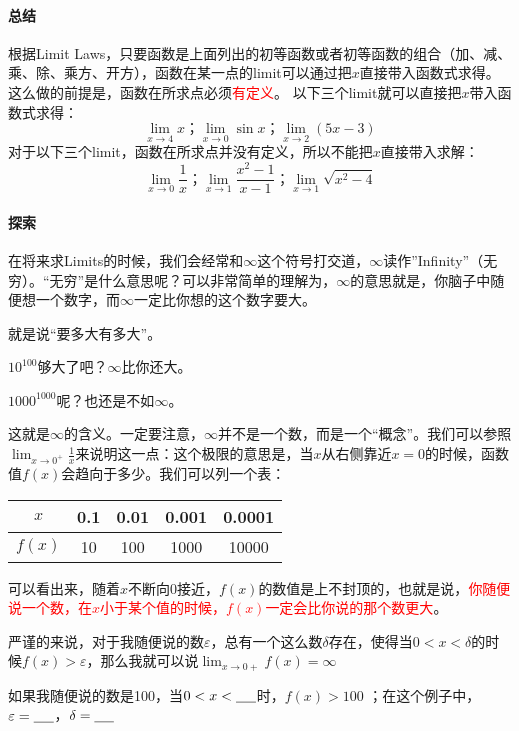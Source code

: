\documentclass[UTF8]{ctexart}
\begin{document}
\paragraph{总结}
根据Limit Laws，只要函数是上面列出的初等函数或者初等函数的组合（加、减、乘、除、乘方、开方），函数在某一点的limit可以通过把$x$直接带入函数式求得。这么做的前提是，函数在所求点必须\textcolor{red}{有定义}。
以下三个limit就可以直接把$x$带入函数式求得：
\[ {\lim_{x \to 4} x } \text{；} {\lim_{x \to 0} \sin x} \text{；} {\lim_{x \to 2} (5x-3)}\]
对于以下三个limit，函数在所求点并没有定义，所以不能把$x$直接带入求解：
\[ {\lim_{x \to 0} \frac{1}{x} } \text{；} {\lim_{x \to 1} \frac {x^2-1}{x-1}} \text{；} {\lim_{x \to 1} \sqrt{x^2-4}}\]

\paragraph{探索}
在将来求Limits的时候，我们会经常和$\infty$这个符号打交道，$\infty$读作''Infinity''（无穷）。“无穷”是什么意思呢？可以非常简单的理解为，$\infty$的意思就是，你脑子中随便想一个数字，而$\infty$一定比你想的这个数字要大。

就是说“要多大有多大”。

$10^{100}$够大了吧？$\infty$比你还大。

$1000^{1000}$呢？也还是不如$\infty$。

这就是$\infty$的含义。一定要注意，$\infty$并不是一个数，而是一个“概念”。我们可以参照${\lim_{x \to 0^+} \frac{1}{x}}$来说明这一点：这个极限的意思是，当$x$从右侧靠近$x=0$的时候，函数值$f(x)$会趋向于多少。我们可以列一个表：

\begin{center}
\begin{tabular}{c|c|c|c|c}
\hline
$x$  & 0.1 & 0.01 & 0.001& 0.0001 \\
\hline
$f(x)$ & 10 & 100 & 1000 & 10000\\
\hline
\end{tabular}
\end{center}

可以看出来，随着$x$不断向$0$接近，$f(x)$的数值是上不封顶的，也就是说，\textcolor{red}{你随便说一个数，在$x$小于某个值的时候，$f(x)$一定会比你说的那个数更大}。

严谨的来说，对于我随便说的数$\varepsilon$，总有一个这么数$\delta$存在，使得当$0<x<\delta$的时候$f(x) > \varepsilon$，那么我就可以说${\lim_{x \to 0+} f(x)} = \infty$

如果我随便说的数是100，当$0<x<\underline{\hbox to 5mm{}}$时，$f(x) > 100$ ；在这个例子中，$\varepsilon = \underline{\hbox to 5mm{}}$，$\delta=\underline{\hbox to 5mm{}}$
\end{document}
